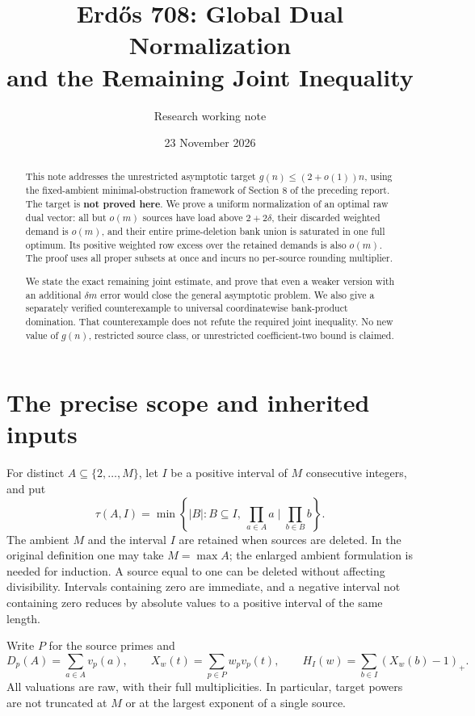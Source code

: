 \documentclass[11pt,a4paper]{article}
\title{Erd\H{o}s 708: Global Dual Normalization\\
and the Remaining Joint Inequality}
\author{Research working note}
\date{23 November 2026}
\theoremstyle{remark}
\newcommand{\pos}[1]{(#1)_+}
\begin{document}
\maketitle
\begin{abstract}
This note addresses the unrestricted asymptotic target
\(g(n)\le(2+o(1))n\), using the fixed-ambient minimal-obstruction
framework of Section 8 of the preceding report. The target is
\textbf{not proved here}. We prove a uniform normalization of an
optimal raw dual vector: all but \(o(m)\) sources have load above
\(2+2\delta\), their discarded weighted demand is \(o(m)\), and their
entire prime-deletion bank union is saturated in one full optimum.
Its positive weighted row excess over the retained demands is also
\(o(m)\). The proof uses all proper subsets at once and incurs no
per-source rounding multiplier.

We state the exact remaining joint estimate, and prove that even
a weaker version with an additional \(\delta m\) error would close the
general asymptotic problem. We also give a separately verified
counterexample to universal coordinatewise bank-product domination.
That counterexample does not refute the required joint inequality.
No new value of \(g(n)\), restricted source class, or unrestricted
coefficient-two bound is claimed.
\end{abstract}
\tableofcontents

\section{The precise scope and inherited inputs}

For distinct \(A\subseteq\{2,\ldots,M\}\), let \(I\) be a positive
interval of \(M\) consecutive integers, and put
\[
 \tau(A,I)=\min\left\{|B|:B\subseteq I,\
          \prod_{a\in A}a\mid\prod_{b\in B}b\right\}.
\]
The ambient \(M\) and the interval \(I\) are retained when sources are
deleted. In the original definition one may take \(M=\max A\);
the enlarged ambient formulation is needed for induction. A source
equal to one can be deleted without affecting divisibility. Intervals
containing zero are immediate, and a negative interval not containing
zero reduces by absolute values to a positive interval of the same
length.

Write \(P\) for the source primes and
\[
 D_p(A)=\sum_{a\in A}v_p(a),\qquad
 X_w(t)=\sum_{p\in P}w_pv_p(t),\qquad
 H_I(w)=\sum_{b\in I}\pos{X_w(b)-1}.
\]
All valuations are raw, with their full multiplicities. In particular,
target powers are not truncated at \(M\) or at the largest exponent
of a single source.
\end{document}
